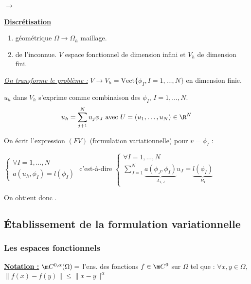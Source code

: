 \documentclass[12pt,a4paper]{article}
\begin{document}
	
	\newpage
	
	$\longrightarrow$ \begin{minipage}[t]{20cm}
		\textbf{\underline{Discrétisation}}
		\begin{enumerate}
			\item[$\star$] géométrique $\Omega \to \Omega_h$ maillage.
			\item[$\star$] de l'inconnue. $V$ espace fonctionnel de dimension infini et $V_h$ de dimension fini.
		\end{enumerate}
	\end{minipage}
	
	\vspace{.5cm}
	
	\underline{\textit{On transforme le problème :}} $V \to V_h = \text{Vect} \{\phi_I, I = 1,\ldots,N\}$ en dimension finie.
	
	$u_h$ dans $V_h$ s'exprime comme combinaison des $\phi_I$, $I = 1,\ldots,N$.
	\[
	u_h = \displaystyle\sum_{j+1}^N u_j \phi_J \text{ avec } U = (u_1, \ldots, u_N) \in \R^N
	\]
	
	On écrit l'expression $(FV)$ (formulation variationnelle) pour $v = \phi_I$ :
	
	$\begin{cases}
		\forall I = 1,\ldots, N\\
		a(u_h,\phi_I) = l(\phi_I)
	\end{cases}$ c'est-à-dire $\begin{cases}
		\forall I = 1,\ldots,N\\
		\displaystyle\sum_{J=1}^N \underbrace{a(\phi_J,\phi_I)}_{A_{I,J}}u_J = \underbrace{l(\phi_I)}_{B_I}
	\end{cases}$
	
	On obtient donc .
	
	\vspace{5cm}
	
	\subsection{Établissement de la formulation variationnelle}
	\subsubsection{Les espaces fonctionnels}
	\underline{\textbf{Notation :}} $\m C^{0,\alpha}(\Omega) = $ l'ens. des fonctions $f \in \m C^0$ sur $\Omega$ tel que :
	\hfill $\forall x,y \in \Omega, $ $\|f(x)-f(y)\| \leq \| x-y\|^\alpha$
	
\end{document}

